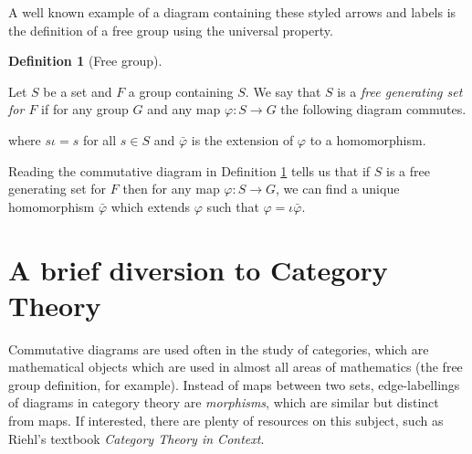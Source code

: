\documentclass[12pt]{article}
\theoremstyle{definition}
\newtheorem{definition}{Definition}
\theoremstyle{remark}
\begin{document}
A well known example of a diagram containing these styled arrows and labels is the definition of a free group using the universal property.

\begin{definition}[Free group]
  \label{def:free-group}

  Let $S$ be a set and $F$ a group containing $S$. We say that $S$ is a \textit{free generating set for $F$} if for any group $G$ and any map $\varphi: S \to G$ the following diagram commutes.

  \begin{center}
  \end{center}

  where $s\iota=s$ for all $s\in S$ and $\bar\varphi$ is the extension of $\varphi$ to a homomorphism.
\end{definition}

Reading the commutative diagram in Definition \ref{def:free-group} tells us that if $S$ is a free generating set for $F$ then for any map $\varphi:S \to G$, we can find a unique homomorphism $\bar\varphi$ which extends $\varphi$ such that $\varphi=\iota\bar\varphi$.


\section{A brief diversion to Category Theory}
\label{sec:cat-theory}

Commutative diagrams are used often in the study of categories, which are mathematical objects which are used in almost all areas of mathematics (the free group definition, for example). Instead of maps between two sets, edge-labellings of diagrams in category theory are \textit{morphisms}, which are similar but distinct from maps. If interested, there are plenty of resources on this subject, such as Riehl's textbook \textit{Category Theory in Context}.
\end{document}
